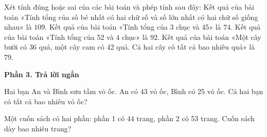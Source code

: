 \begin{ex} %
Xét tính đúng hoặc sai của các bài toán và phép tính sau đây:
\choiceTF
{\True Kết quả của bài toán «Tính tổng của số bé nhất có hai chữ số và số lớn nhất có hai chữ số giống nhau» là $109$.}
{Kết quả của bài toán «Tính tổng của 3 chục và 45» là $74$.}
{\True Kết quả của bài toán «Tính tổng của 52 và 4 chục» là $92$.}
{Kết quả của bài toán «Một cây bưởi có 36 quả, một cây cam có 42 quả. Cả hai cây có tất cả bao nhiêu quả» là $79$.}
\end{ex}

\textbf{Phần 3. Trả lời ngắn}

\begin{ex} %
Hai bạn An và Bình sưu tầm vỏ ốc. An có 43 vỏ ốc, Bình có 25 vỏ ốc. Cả hai bạn có tất cả bao nhiêu vỏ ốc?
\end{ex}

\begin{ex} %
Một cuốn sách có hai phần: phần 1 có 44 trang, phần 2 có 53 trang. Cuốn sách dày bao nhiêu trang?
\end{ex}

